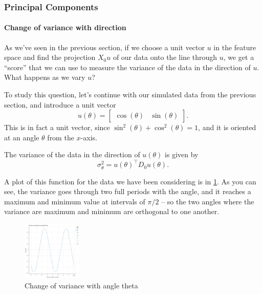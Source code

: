 \documentclass[]{article}
\let\oldparagraph\paragraph
\renewcommand{\paragraph}[1]{\oldparagraph{#1}\mbox{}}
\begin{document}
\hypertarget{principal-components}{%
\subsubsection{Principal Components}\label{principal-components}}

\hypertarget{change-of-variance-with-direction}{%
\paragraph{Change of variance with
direction}\label{change-of-variance-with-direction}}

As we've seen in the previous section, if we choose a unit vector \(u\)
in the feature space and find the projection \(X_{0}u\) of our data onto
the line through \(u\), we get a ``score'' that we can use to measure
the variance of the data in the direction of \(u\). What happens as we
vary \(u\)?

To study this question, let's continue with our simulated data from the
previous section, and introduce a unit vector \[
u(\theta) = \left[\begin{matrix} \cos(\theta) & \sin(\theta)\end{matrix}\right].
\] This is in fact a unit vector, since
\(\sin^2(\theta)+\cos^2(\theta)=1\), and it is oriented at an angle
\(\theta\) from the \(x\)-axis.

The variance of the data in the direction of \(u(\theta)\) is given by
\[
\sigma_{\theta}^2 = u(\theta)^{\intercal}D_{0}u(\theta).
\]

A plot of this function for the data we have been considering is in
\cref{fig:pcatheta}. As you can see, the variance goes through two full
periods with the angle, and it reaches a maximum and minimum value at
intervals of \(\pi/2\) -- so the two angles where the variance are
maximum and minimum are orthogonal to one another.

\begin{figure}
\hypertarget{fig:pcatheta}{%
\centering
\includegraphics[width=0.25\textwidth,height=\textheight]{../img/PCAtheta.png}
\caption{Change of variance with angle theta}\label{fig:pcatheta}
}
\end{figure}
\end{document}
